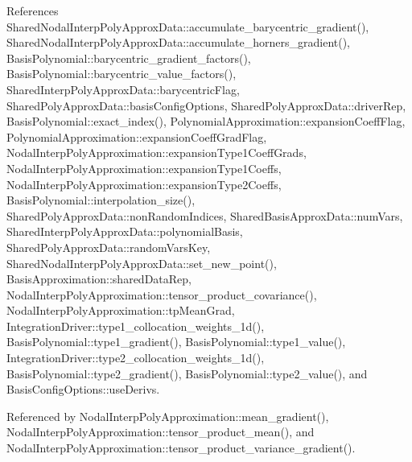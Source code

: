 References Shared\+Nodal\+Interp\+Poly\+Approx\+Data\+::accumulate\+\_\+barycentric\+\_\+gradient(), Shared\+Nodal\+Interp\+Poly\+Approx\+Data\+::accumulate\+\_\+horners\+\_\+gradient(), Basis\+Polynomial\+::barycentric\+\_\+gradient\+\_\+factors(), Basis\+Polynomial\+::barycentric\+\_\+value\+\_\+factors(), Shared\+Interp\+Poly\+Approx\+Data\+::barycentric\+Flag, Shared\+Poly\+Approx\+Data\+::basis\+Config\+Options, Shared\+Poly\+Approx\+Data\+::driver\+Rep, Basis\+Polynomial\+::exact\+\_\+index(), Polynomial\+Approximation\+::expansion\+Coeff\+Flag, Polynomial\+Approximation\+::expansion\+Coeff\+Grad\+Flag, Nodal\+Interp\+Poly\+Approximation\+::expansion\+Type1\+Coeff\+Grads, Nodal\+Interp\+Poly\+Approximation\+::expansion\+Type1\+Coeffs, Nodal\+Interp\+Poly\+Approximation\+::expansion\+Type2\+Coeffs, Basis\+Polynomial\+::interpolation\+\_\+size(), Shared\+Poly\+Approx\+Data\+::non\+Random\+Indices, Shared\+Basis\+Approx\+Data\+::num\+Vars, Shared\+Interp\+Poly\+Approx\+Data\+::polynomial\+Basis, Shared\+Poly\+Approx\+Data\+::random\+Vars\+Key, Shared\+Nodal\+Interp\+Poly\+Approx\+Data\+::set\+\_\+new\+\_\+point(), Basis\+Approximation\+::shared\+Data\+Rep, Nodal\+Interp\+Poly\+Approximation\+::tensor\+\_\+product\+\_\+covariance(), Nodal\+Interp\+Poly\+Approximation\+::tp\+Mean\+Grad, Integration\+Driver\+::type1\+\_\+collocation\+\_\+weights\+\_\+1d(), Basis\+Polynomial\+::type1\+\_\+gradient(), Basis\+Polynomial\+::type1\+\_\+value(), Integration\+Driver\+::type2\+\_\+collocation\+\_\+weights\+\_\+1d(), Basis\+Polynomial\+::type2\+\_\+gradient(), Basis\+Polynomial\+::type2\+\_\+value(), and Basis\+Config\+Options\+::use\+Derivs.



Referenced by Nodal\+Interp\+Poly\+Approximation\+::mean\+\_\+gradient(), Nodal\+Interp\+Poly\+Approximation\+::tensor\+\_\+product\+\_\+mean(), and Nodal\+Interp\+Poly\+Approximation\+::tensor\+\_\+product\+\_\+variance\+\_\+gradient().

